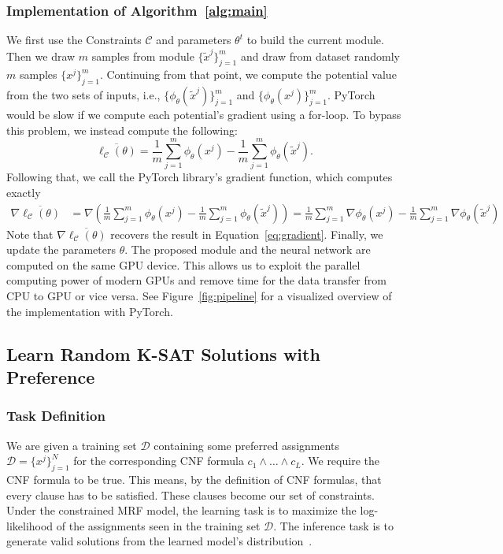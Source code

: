 \subsubsection*{Implementation of  Algorithm~\ref{alg:main}}  We first use the Constraints $\mathcal{C}$ and parameters $\theta^t$ to build the current \nls module.  Then we draw $m$ samples from \nls module $\{\tilde{x}^j\}_{j=1}^m$ and draw from dataset randomly $m$ samples $\{x^j\}_{j=1}^m$. Continuing from that point, we compute the potential value from the two sets of inputs, i.e., $\{ \phi_{\theta}(\tilde{x}^j)\}_{j=1}^m$ and $\{ \phi_{\theta}(x^j)\}_{j=1}^m$. PyTorch would be slow if we compute each potential's gradient using a for-loop. To bypass this problem, we instead compute the following:
\begin{equation} \label{eq:emp-gradient}
    \overline{\ell_{\mathcal{C}}(\theta)}= \frac{1}{m}\sum_{j=1}^m \phi_{\theta}(x^j)-\frac{1}{m}\sum_{j=1}^m \phi_{\theta}(\tilde{x}^j).
\end{equation}
Following that, we call the PyTorch library's gradient function, which computes exactly
\begin{equation*}
    \begin{aligned}
        \nabla\overline{\ell_{\mathcal{C}}(\theta)} & =\nabla\left(\frac{1}{m}\sum_{j=1}^m \phi_{\theta}(x^j)-\frac{1}{m}\sum_{j=1}^m \phi_{\theta}(\tilde{x}^j)\right)=\frac{1}{m}\sum_{j=1}^m \nabla\phi_{\theta}(x^j)-\frac{1}{m}\sum_{j=1}^m \nabla\phi_{\theta}(\tilde{x}^j)
    \end{aligned}
\end{equation*}
Note that $\nabla\overline{\ell_{\mathcal{C}}(\theta)}$ recovers the result in Equation~\eqref{eq:gradient}. Finally, we update the parameters $\theta$. The proposed \nls module and the neural network are computed on the same GPU device. This allows us to exploit the parallel computing power of modern GPUs and remove time for the data transfer from CPU to GPU or vice versa.   See Figure~\ref{fig:pipeline} for a visualized overview of the implementation with PyTorch.

\subsection{Learn Random K-SAT Solutions with Preference}
\subsubsection*{Task Definition}  We are given a training set $\mathcal{D}$ containing some preferred assignments
$\mathcal{D}=\{x^j\}_{j=1}^N$ for the corresponding CNF formula
$c_1\wedge\ldots\wedge c_L$. We require the CNF formula to be true. This means,
by the definition of CNF formulas, that every clause has to be satisfied. These
clauses become our set of constraints. Under the constrained MRF model, the
learning task is to maximize the log-likelihood of the assignments seen in the
training set $\mathcal{D}$. The inference task is to generate valid solutions
from the learned model's
distribution~\citep{DBLP:conf/aiia/DodaroP19,DBLP:conf/sac/RosaGO11}.

